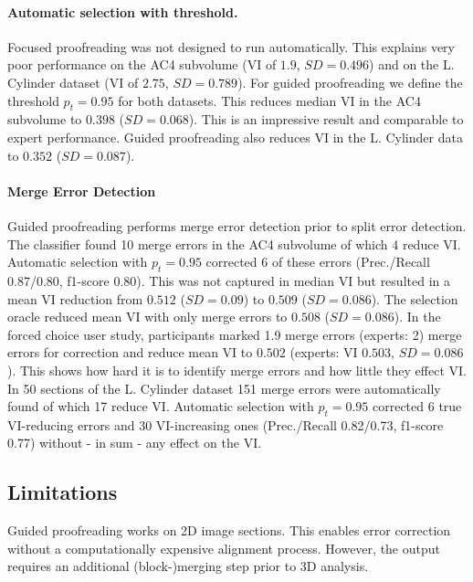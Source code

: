 \paragraph{Automatic selection with threshold.} Focused proofreading was not designed to run automatically. This explains very poor performance on the AC4 subvolume (VI of $1.9$, $SD=0.496$) and on the L. Cylinder dataset (VI of $2.75$, $SD=0.789$). For guided proofreading we define the threshold $p_t=0.95$ for both datasets. This reduces median VI in the AC4 subvolume to $0.398$ ($SD=0.068$). This is an impressive result and comparable to expert performance. Guided proofreading also reduces VI in the L. Cylinder data to $0.352$ ($SD=0.087$).

\paragraph{Merge Error Detection} Guided proofreading performs merge error detection prior to split error detection. The classifier found 10 merge errors in the AC4 subvolume of which 4 reduce VI. Automatic selection with $p_t=0.95$ corrected 6 of these errors (Prec./Recall 0.87/0.80, f1-score 0.80). This was not captured in median VI but resulted in a mean VI reduction from $0.512$ ($SD=0.09$) to $0.509$ ($SD=0.086$). The selection oracle reduced mean VI with only merge errors to $0.508$ ($SD=0.086$). In the forced choice user study, participants marked 1.9 merge errors (experts: 2) merge errors for correction and reduce mean VI to $0.502$ (experts: VI $0.503$, $SD=0.086$). This shows how hard it is to identify merge errors and how little they effect VI. In 50 sections of the L. Cylinder dataset 151 merge errors were automatically found of which 17 reduce VI. Automatic selection with $p_t=0.95$ corrected 6 true VI-reducing errors and 30 VI-increasing ones (Prec./Recall 0.82/0.73, f1-score 0.77) without - in sum - any effect on the VI. 

\subsection{Limitations}
Guided proofreading works on 2D image sections. This enables error correction without a computationally expensive alignment process. However, the output requires an additional (block-)merging step prior to 3D  analysis.
